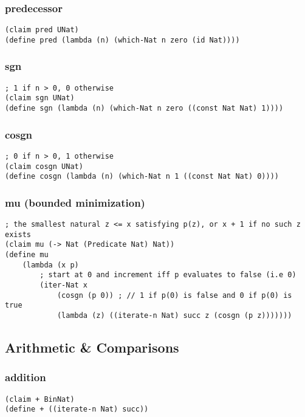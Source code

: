 \subsubsection{predecessor} \label{code:predecessor}
\begin{verbatim}
(claim pred UNat)
(define pred (lambda (n) (which-Nat n zero (id Nat))))
\end{verbatim}

\subsubsection{sgn} \label{code:sgn}
\begin{verbatim}
; 1 if n > 0, 0 otherwise
(claim sgn UNat)
(define sgn (lambda (n) (which-Nat n zero ((const Nat Nat) 1))))
\end{verbatim}

\subsubsection{cosgn} \label{code:cosgn}
\begin{verbatim}
; 0 if n > 0, 1 otherwise
(claim cosgn UNat)
(define cosgn (lambda (n) (which-Nat n 1 ((const Nat Nat) 0))))
\end{verbatim}

\subsubsection{mu (bounded minimization)} \label{code:mu}
\begin{verbatim}
; the smallest natural z <= x satisfying p(z), or x + 1 if no such z exists
(claim mu (-> Nat (Predicate Nat) Nat))
(define mu
    (lambda (x p)
        ; start at 0 and increment iff p evaluates to false (i.e 0)
        (iter-Nat x 
            (cosgn (p 0)) ; // 1 if p(0) is false and 0 if p(0) is true
            (lambda (z) ((iterate-n Nat) succ z (cosgn (p z)))))))
\end{verbatim}


\subsection{Arithmetic \& Comparisons}

\subsubsection{addition} \label{code:addition}
\begin{verbatim}
(claim + BinNat)
(define + ((iterate-n Nat) succ))
\end{verbatim}


